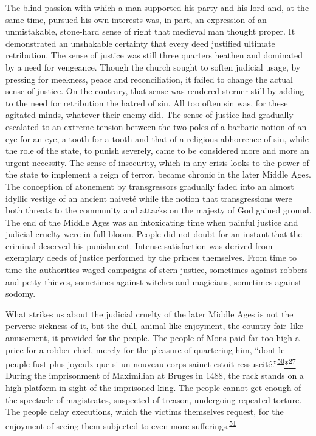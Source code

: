 The blind passion with which a man supported his party and his lord and,
at the same time, pursued his own interests was, in part, an expression
of an unmistakable, stone-hard sense of right that medieval man thought
proper. It demonstrated an unshakable certainty that every deed
justified ultimate retribution. The sense of justice was still three
quarters heathen and dominated by a need for vengeance. Though the
church sought to soften judicial usage, by pressing for meekness, peace
and reconciliation, it failed to change the actual sense of justice. On
the contrary, that sense was rendered sterner still by adding to the
need for retribution the hatred of sin. All too often sin was, for these
agitated minds, whatever their enemy did. The sense of justice had
gradually escalated to an extreme tension between the two poles of a
barbaric notion of an eye for an eye, a tooth for a tooth and that of a
religious abhorrence of sin, while the role of the state, to punish
severely, came to be considered more and more an urgent necessity. The
sense of insecurity, which in any crisis looks to the power of the state
to implement a reign of terror, became chronic in the later Middle Ages.
The conception of atonement by transgressors gradually faded into an
almost idyllic vestige of an ancient naiveté while the notion that
transgressions were both threats to the community and attacks on the
majesty of God gained ground. The end of the Middle Ages was an
intoxicating time when painful justice and judicial cruelty were in full
bloom. People did not doubt for an instant that the criminal deserved
his punishment. Intense satisfaction was derived from exemplary deeds of
justice performed by the princes themselves. From time to time the
authorities waged campaigns of stern justice, sometimes against robbers
and petty thieves, sometimes against witches and magicians, sometimes
against sodomy.

What strikes us about the judicial cruelty of the later Middle Ages is
not the perverse sickness of it, but the dull, animal-like enjoyment,
the country fair--like amusement, it provided for the people. The people
of Mons paid far too high a price for a robber chief, merely for the
pleasure of quartering him, ``dont
\protect\hypertarget{08_Chapter_One__THE_PASSIONATE_INTE.xhtmlux5cux23page_21}{}{}le
peuple fust plus joyeulx que si un nouveau corps sainct estoit
ressuscité.''\textsuperscript{\protect\hypertarget{08_Chapter_One__THE_PASSIONATE_INTE.xhtmlux5cux23id_2131}{\protect\hyperlink{23_NOTES.xhtmlux5cux23id_2132}{50}}}\protect\hypertarget{08_Chapter_One__THE_PASSIONATE_INTE.xhtmlux5cux23id_2387}{\protect\hyperlink{23_NOTES.xhtmlux5cux23id_2388}{*\textsuperscript{27}}}
During the imprisonment of Maximilian at Bruges in 1488, the rack stands
on a high platform in sight of the imprisoned king. The people cannot
get enough of the spectacle of magistrates, suspected of treason,
undergoing repeated torture. The people delay executions, which the
victims themselves request, for the enjoyment of seeing them subjected
to even more
sufferings.\textsuperscript{\protect\hypertarget{08_Chapter_One__THE_PASSIONATE_INTE.xhtmlux5cux23id_2129}{\protect\hyperlink{23_NOTES.xhtmlux5cux23id_2130}{51}}}

